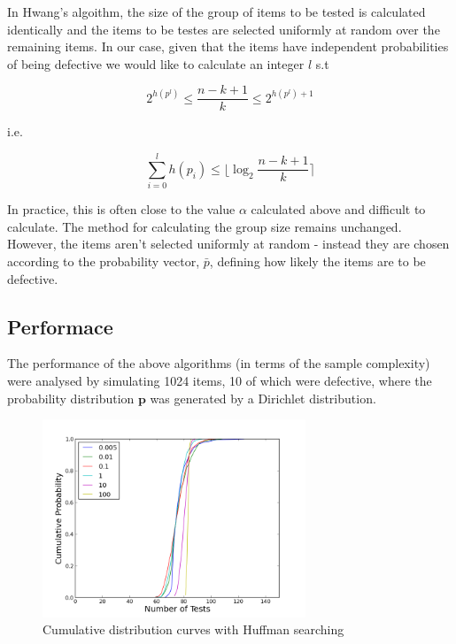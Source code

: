\documentclass{article}
\renewcommand{\vec}[1]{\mathbf{#1}}
\begin{document}
In Hwang's algoithm, the size of the group of items to be tested is calculated identically and the items to be testes are selected uniformly at random over the remaining items. In our case, given that the items have independent probabilities of being defective we would like to calculate an integer \(l\) s.t

\begin{equation}
2^{h\left(p^l\right)} \leq \frac{n-k+1}{k} \leq 2^{h\left(p^l\right) + 1}
\end{equation}

i.e.

\begin{equation}
\sum_{i=0}^l h\left(p_i\right) \leq \lfloor \log_2{\frac{n-k+1}{k}} \rceil
\end{equation}

In practice, this is often close to the value \(\alpha\) calculated above and difficult to calculate. The method for calculating the group size remains unchanged. However, the items aren't selected uniformly at random - instead they are chosen according to the probability vector, \(\bar{p}\), defining how likely the items are to be defective.

\subsection{Performace}
The performance of the above algorithms (in terms of the sample complexity) were analysed by simulating 1024 items, 10 of which were defective, where the probability distribution \(\vec{p}\) was generated by a Dirichlet distribution.

\begin{figure}[h]
\centering
\includegraphics[width=0.7\textwidth]{manyalphalabels.png}
\caption{Cumulative distribution curves with Huffman searching}
\end{figure}
\end{document}
